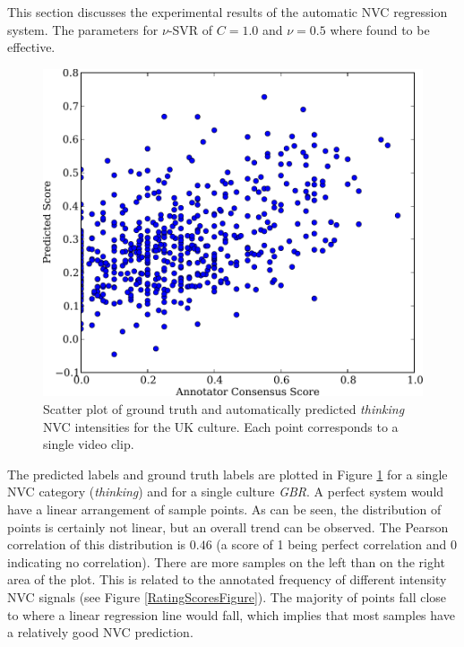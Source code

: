 This section discusses the experimental results of the automatic \ac{NVC} regression system. 
The parameters for $\nu$-SVR of $C = 1.0$ and $\nu = 0.5$ where found to be effective.


\begin{figure}
\centering
\includegraphics[width = 0.60 \columnwidth]{nvcregression/ScatterThinkUk.pdf}
\caption{Scatter plot of ground truth and automatically predicted \textit{thinking} \ac{NVC} intensities for the \ac{UK} culture. Each point corresponds to a single video clip.}
\label{ThinkScatterFigure}
\end{figure}

The predicted labels and ground truth labels are plotted in Figure \ref{ThinkScatterFigure} for a single \ac{NVC} category (\textit{thinking}) and for a single culture \textit{GBR}. A perfect system would have a linear arrangement of sample points. As can be seen, the distribution of points is certainly not linear, but an overall trend can be observed. 
The Pearson correlation of this distribution is $0.46$ (a score of 1 being perfect correlation and 0 indicating no correlation). There are more samples on the left than on the right area of the plot. This is related to the annotated frequency of different intensity \ac{NVC} signals (see Figure \ref{RatingScoresFigure}). %
The majority of points fall close to where a linear regression line would fall, which implies that most samples have a relatively good \ac{NVC} prediction.


